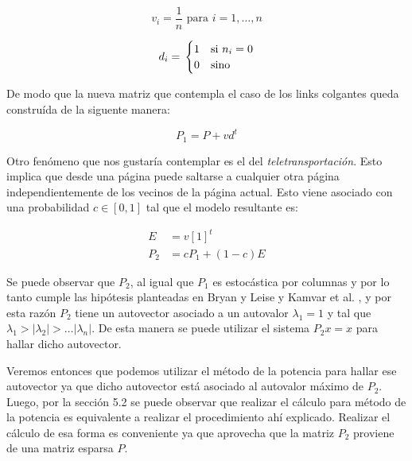\[ v_{i} = \frac{1}{n} \text{ para } i = 1, \dots, n\]

\[ d_{i} = \\
	\begin{cases}
		1 & \text{si } n_{i} = 0\\
		0 & \text{sino}
	\end{cases}
\]
 
De modo que la nueva matriz que contempla el caso de los links colgantes queda constru\'ida de la siguente manera:

\[ P_{1} = P + vd^{t}\]

Otro fen\'omeno que nos gustar\'ia contemplar es el del \emph{teletransportaci\'on}. Esto implica que desde una p\'agina puede saltarse a cualquier otra p\'agina independientemente de los vecinos de la p\'agina actual. Esto viene asociado con una probabilidad $c \in [0,1]$ tal que el modelo resultante es:

\begin{align*}
	E &= v[1]^{t}\\
	P_{2} &= cP_{1} + (1-c)E
\end{align*}

Se puede observar que $P_{2}$, al igual que $P_{1}$ es estoc\'astica por columnas y por lo tanto cumple las hip\'otesis planteadas en Bryan y Leise\cite{Bryan2006} y Kamvar et al.\cite{Kamvar2003} , y por esta raz\'on $P_{2}$ tiene un autovector asociado a un autovalor $\lambda_{1} = 1$ y tal que $\lambda_{1} > |\lambda_{2}| > \dots |\lambda_{n}|$. De esta manera se puede utilizar el sistema $P_{2}x = x$ para hallar dicho autovector.


Veremos entonces que podemos utilizar el m\'etodo de la potencia para hallar ese autovector ya que dicho autovector est\'a asociado al autovalor m\'aximo de $P_{2}$. Luego, por la secci\'on 5.2 se puede observar que realizar el c\'alculo para m\'etodo de la potencia es equivalente a realizar el procedimiento ah\'i explicado. Realizar el c\'alculo de esa forma es conveniente ya que aprovecha que la matriz $P_{2}$ proviene de una matriz esparsa $P$.